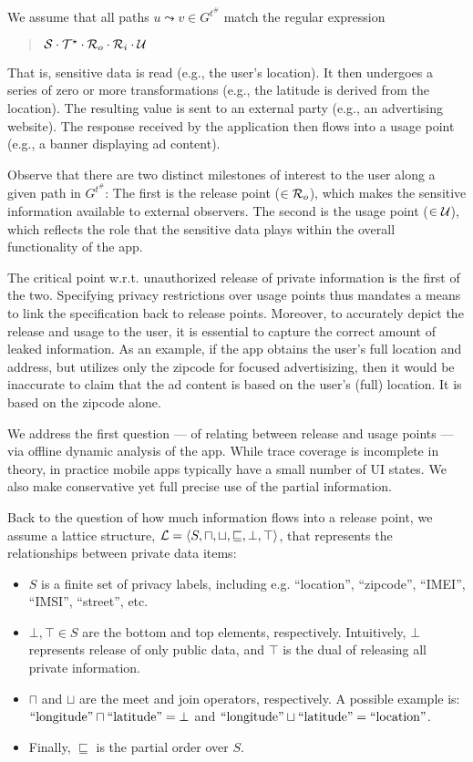 \documentclass[]{article}
\begin{document}
We assume that all paths $u \leadsto v \in G^{t^{\#}}$ match the regular expression
\begin{quote}
	${\cal S} \cdot {\cal T}^{\star} \cdot {\cal R}_o \cdot {\cal R}_i \cdot {\cal U}$
\end{quote}
That is, sensitive data is read (e.g., the user's location). It then undergoes a series of zero or more transformations (e.g., the latitude is derived from the location). The resulting value is sent to an external party (e.g., an advertising website). The response received by the application then flows into a usage point (e.g., a banner displaying ad content).

Observe that there are two distinct milestones of interest to the user along a given path in $G^{t^{\#}}$: The first is the release point ($\in {\cal R}_o$), which makes the sensitive information available to external observers. The second is the usage point ($\in {\cal U}$), which reflects the role that the sensitive data plays within the overall functionality of the app.

The critical point w.r.t. unauthorized release of private information is the first of the two. Specifying privacy restrictions over usage points thus mandates a means to link the specification back to release points. Moreover, to accurately depict the release and usage to the user, it is essential to capture the correct amount of leaked information. As an example, if the app obtains the user's full location and address, but utilizes only the zipcode for focused advertisizing, then it would be inaccurate to claim that the ad content is based on the user's (full) location. It is based on the zipcode alone.

We address the first question --- of relating between release and usage points --- via offline dynamic analysis of the app. While trace coverage is incomplete in theory, in practice mobile apps typically have a small number of UI states. We also make conservative yet full precise use of the partial information.

Back to the question of how much information flows into a release point, we assume a lattice structure, 
${\cal L} = \left\langle S,\sqcap,\sqcup,\sqsubseteq,\bot,\top \right\rangle$, that represents the relationships between private data items:
\begin{itemize}
	\item $S$ is a finite set of privacy labels, including e.g. ``location'', ``zipcode'', ``IMEI'', ``IMSI'', ``street'', etc.
	\item $\bot,\top \in S$ are the bottom and top elements, respectively. Intuitively, $\bot$ represents release of only public data, and $\top$ is the dual of releasing all private information.
	\item $\sqcap$ and $\sqcup$ are the meet and join operators, respectively. A possible example is: $\textnormal{``longitude''} \sqcap \textnormal{``latitude''} = \bot$ and $\textnormal{``longitude''} \sqcup \textnormal{``latitude''} = \textnormal{``location''}$.
	\item Finally, $\sqsubseteq$ is the partial order over $S$.
\end{itemize}
\end{document}

